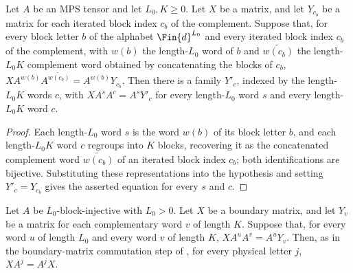 \begin{lemma}
    \label{lem:block_mateq_of_blocked_mateq}
    \leanok
    Let $A$ be an MPS tensor and let $L_0,K\ge 0$. Let $X$ be a matrix, and let
    $Y_{c_b}$ be a matrix for each iterated block index $c_b$ of the complement.
    Suppose that, for every block letter $b$ of the alphabet
    $\Fin{d}^{L_0}$ and every iterated block index $c_b$ of the
    complement, with $w(b)$ the length-$L_0$ word of $b$ and
    $\widetilde{w(c_b)}$ the length-$L_0K$ complement word obtained by
    concatenating the blocks of $c_b$,
    $X A^{w(b)} A^{\widetilde{w(c_b)}} = A^{w(b)} Y_{c_b}$.
    Then there is a family $Y'_c$, indexed by the length-$L_0K$ words $c$, with
    $X A^s A^c = A^s Y'_c$
    for every length-$L_0$ word $s$ and every length-$L_0K$ word $c$.
\end{lemma}

\begin{proof}
    \leanok
    Each length-$L_0$ word $s$ is the word $w(b)$ of its block letter $b$,
    and each length-$L_0K$ word $c$ regroups into $K$ blocks, recovering it as
    the concatenated complement word $\widetilde{w(c_b)}$ of an iterated block
    index $c_b$; both identifications are bijective. Substituting these
    representations into the hypothesis and setting $Y'_c=Y_{c_b}$ gives the
    asserted equation for every $s$ and $c$.
\end{proof}

\begin{lemma}
    \label{lem:boundary_matrix_commutes_block_window}
    \leanok
    Let $A$ be $L_0$-block-injective with $L_0>0$. Let $X$ be a boundary
    matrix, and let $Y_v$ be a matrix for each complementary word $v$ of
    length $K$. Suppose that, for every word $u$ of length $L_0$ and every
    word $v$ of length $K$,
    $X A^u A^v = A^u Y_v$.
    Then, as in the boundary-matrix commutation step of
    \cite[Section~IV.C, lines~2049--2090]{Cirac2021Matrix}, for every physical
    letter $j$,
    $X A^j = A^j X$.
\end{lemma}

